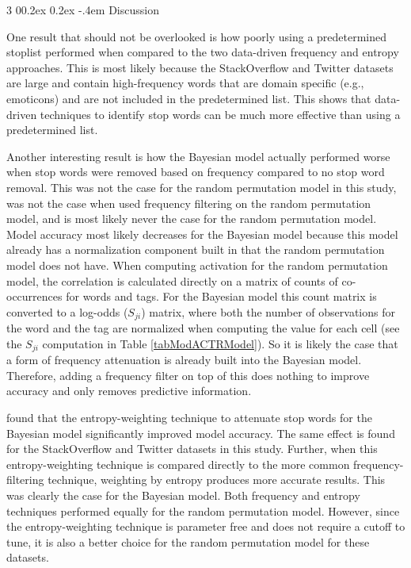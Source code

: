 \documentclass[man,donotrepeattitle]{apa6}
\makeatletter
\renewcommand{\subsubsection}{%
  \@startsection
  {subsubsection}%
  {3}%
  {\parindent}%
  {0\baselineskip \@plus 0.2ex \@minus 0.2ex}%
  {-.4em}%
  {\normalfont\normalsize\bfseries\addperi}}
\makeatother
\begin{document}
\subsubsection{Discussion}

One result that should not be overlooked is how poorly using a predetermined stoplist performed when compared to the two data-driven frequency and entropy approaches.
This is most likely because the StackOverflow and Twitter datasets are large and contain high-frequency words that are domain specific (e.g., emoticons) and are not included in the predetermined list.
This shows that data-driven techniques to identify stop words can be much more effective than using a predetermined list.

Another interesting result is how the Bayesian model actually performed worse when stop words were removed based on frequency compared to no stop word removal.
This was not the case for the random permutation model in this study, was not the case when \textcite{Sahlgren2008} used frequency filtering on the random permutation model,
and is most likely never the case for the random permutation model.
Model accuracy most likely decreases for the Bayesian model because this model already has a normalization component built in that the random permutation model does not have.
When computing activation for the random permutation model, the correlation is calculated directly on a matrix of counts of co-occurrences for words and tags.
For the Bayesian model this count matrix is converted to a log-odds ($S_{ji}$) matrix,
where both the number of observations for the word and the tag are normalized when computing the value for each cell (see the $S_{ji}$ computation in Table \ref{tabModACTRModel}).
So it is likely the case that a form of frequency attenuation is already built into the Bayesian model.
Therefore, adding a frequency filter on top of this does nothing to improve accuracy and only removes predictive information.

\textcite{Stanley2013} found that the entropy-weighting technique to attenuate stop words for the Bayesian model significantly improved model accuracy.
The same effect is found for the StackOverflow and Twitter datasets in this study.
Further, when this entropy-weighting technique is compared directly to the more common frequency-filtering technique, weighting by entropy produces more accurate results.
This was clearly the case for the Bayesian model.
Both frequency and entropy techniques performed equally for the random permutation model.
However, since the entropy-weighting technique is parameter free and does not require a cutoff to tune, it is also a better choice for the random permutation model for these datasets.
\end{document}
